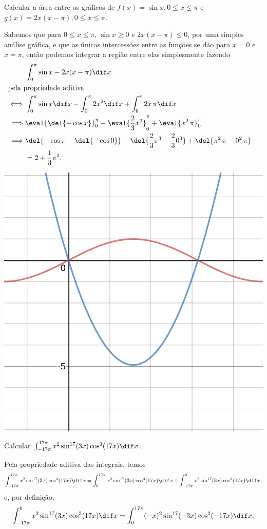\documentclass{IMTexam}
\begin{document}
	\begin{questions}
		\question Calcular a área entre os gráficos de $ f(x) = \sin x, 0 \leqslant x \leqslant \pi $ e $ g(x) = 2x(x − \pi), 0 \leqslant x \leqslant \pi $.
		
		\begin{solution}
			Sabemos que para $ 0\leqslant x \leqslant \pi $, $ \sin x\geqslant 0 $ e $ 2x(x-\pi)\leqslant 0 $, por uma simples análise gráfica, e que as únicas intercessões entre as funções se dão para $ x=0 $ e $ x=\pi $, então podemos integrar a região entre elas simplesmente fazendo
			\begin{align*}
				&\int_{0}^{\pi}\sin x - 2x(x-\pi)\dif x\\ \intertext{pela propriedade aditiva}
				\iff &\int_{0}^{\pi}\sin x \dif x - \int_{0}^{\pi} 2x^{2}\dif x +\int_{0}^{\pi}2x\,\pi\dif x\\
				\implies &\eval{\del{-\cos x}}_{0}^{\pi} - \eval{\dfrac{2}{3}x^{3}}_{0}^{\pi} +\eval{x^{2}\,\pi}_{0}^{\pi}&\\
				\implies &\del{-\cos\pi-\del{-\cos0}} - \del{\dfrac{2}{3}\pi^{3}-\dfrac{2}{3}0^{3}} +\del{\pi^{2}\,\pi-0^{2}\,\pi}\\
				&=2+\dfrac{1}{3}\pi^{3}.
			\end{align*}
			
			
			\begin{center}
				\includegraphics[width=0.6\linewidth]{graph}
			\end{center}
			
		\end{solution}
		
		\question Calcular $ \int_{-17\pi}^{17\pi} x^{2}\sin^{17}(3x)\cos^{3}(17x)\dif x $.
		
		\begin{solution}
			Pela propriedade aditiva das integrais, temos
			\[ \int_{-17\pi}^{17\pi} x^{2}\sin^{17}(3x)\cos^{3}(17x)\dif x = \int_{0}^{17\pi} x^{2}\sin^{17}(3x)\cos^{3}(17x)\dif x + \int_{-17\pi}^{0} x^{2}\sin^{17}(3x)\cos^{3}(17x)\dif x, \]
			e, por definição,
			\[ \int_{-17\pi}^{0} x^{2}\sin^{17}(3x)\cos^{3}(17x)\dif x = \int_{0}^{17\pi} (-x)^{2}\sin^{17}(-3x)\cos^{3}(-17x)\dif x. \]
			

\end{solution}
\end{questions}
\end{document}
